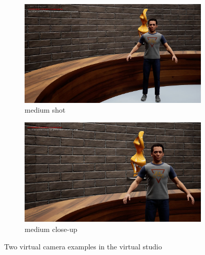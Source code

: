 \documentclass[
  a4paper,  %
  twoside,  %
  bibliography=totoc,
  headsepline,
  cleardoublepage=empty,
  parskip=half,
  draft=false
]{scrbook}
\begin{document}
\begin{figure}[h]
  \centering
  \begin{subfigure}{0.45\textwidth}
    \includegraphics[width=\linewidth]{graphics/images/unreal-engine/camera angles/medium closeup.png}
    \caption{medium shot}
  \end{subfigure}
  \begin{subfigure}{0.45\textwidth}
    \includegraphics[width=\linewidth]{graphics/images/unreal-engine/camera angles/close up.png}
    \caption{medium close-up}
  \end{subfigure}
  \caption{Two virtual camera examples in the virtual studio}
  \label{fig:cameras}
\end{figure}
\end{document}
